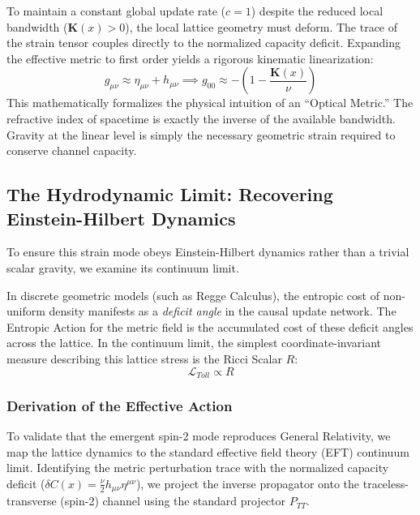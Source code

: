 To maintain a constant global update rate ($c=1$) despite the reduced local bandwidth ($\mathbf{K}(x) > 0$), the local lattice geometry must deform. The trace of the strain tensor couples directly to the normalized capacity deficit. Expanding the effective metric to first order yields a rigorous kinematic linearization:
\begin{equation}
g_{\mu\nu} \approx \eta_{\mu\nu} + h_{\mu\nu} \implies g_{00} \approx -\left( 1 - \frac{\mathbf{K}(x)}{\nu} \right)
\end{equation}
This mathematically formalizes the physical intuition of an ``Optical Metric.'' The refractive index of spacetime is exactly the inverse of the available bandwidth. Gravity at the linear level is simply the necessary geometric strain required to conserve channel capacity.

\subsection{The Hydrodynamic Limit: Recovering Einstein-Hilbert Dynamics}
To ensure this strain mode obeys Einstein-Hilbert dynamics rather than a trivial scalar gravity, we examine its continuum limit.

In discrete geometric models (such as Regge Calculus), the entropic cost of non-uniform density manifests as a \textit{deficit angle} in the causal update network. The Entropic Action for the metric field is the accumulated cost of these deficit angles across the lattice. In the continuum limit, the simplest coordinate-invariant measure describing this lattice stress is the Ricci Scalar $R$:
\begin{equation}
\mathcal{L}_{Toll} \propto R
\end{equation}

\subsubsection{Derivation of the Effective Action}
To validate that the emergent spin-2 mode reproduces General Relativity, we map the lattice dynamics to the standard effective field theory (EFT) continuum limit. Identifying the metric perturbation trace with the normalized capacity deficit ($\delta C(x) = \frac{\nu}{2} h_{\mu\nu} \eta^{\mu\nu}$), we project the inverse propagator onto the traceless-transverse (spin-2) channel using the standard projector $P_{TT}$. 


